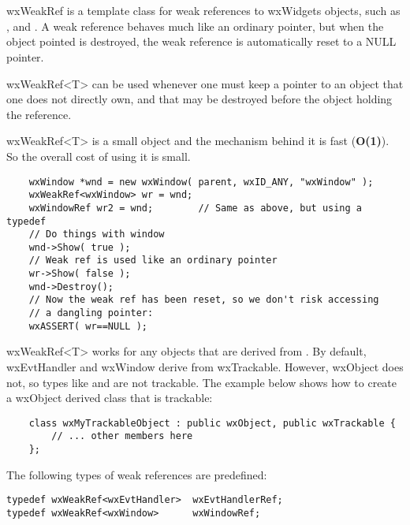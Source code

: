 \section{}\label{wxweakref}

wxWeakRef is a template class for weak references to wxWidgets objects, 
such as ,  and 
. A weak reference behaves much like an ordinary
pointer, but when the object pointed is destroyed, the weak reference is
automatically reset to a NULL pointer. 

wxWeakRef<T> can be used whenever one must keep a pointer to an object 
that one does not directly own, and that may be destroyed before the object
holding the reference. 

wxWeakRef<T> is a small object and the mechanism behind it is fast 
(\textbf{O(1)}). So the overall cost of using it is small. 



\begin{verbatim}
    wxWindow *wnd = new wxWindow( parent, wxID_ANY, "wxWindow" );
    wxWeakRef<wxWindow> wr = wnd;  
    wxWindowRef wr2 = wnd;        // Same as above, but using a typedef
    // Do things with window
    wnd->Show( true );
    // Weak ref is used like an ordinary pointer 
    wr->Show( false );
    wnd->Destroy(); 
    // Now the weak ref has been reset, so we don't risk accessing
    // a dangling pointer:
    wxASSERT( wr==NULL );
\end{verbatim}

wxWeakRef<T> works for any objects that are derived from .
By default, wxEvtHandler and wxWindow derive from wxTrackable. However, 
wxObject does not, so types like  and 
 are not trackable. The example below shows how to
create a wxObject derived class that is trackable: 

\begin{verbatim}
    class wxMyTrackableObject : public wxObject, public wxTrackable { 
        // ... other members here 
    }; 
\end{verbatim}


The following types of weak references are predefined: 

\begin{verbatim}
typedef wxWeakRef<wxEvtHandler>  wxEvtHandlerRef;
typedef wxWeakRef<wxWindow>      wxWindowRef;
\end{verbatim}


